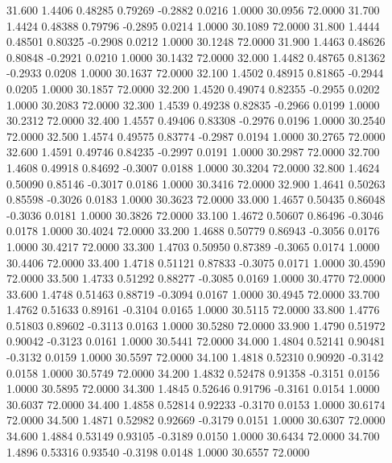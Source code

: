   31.600   1.4406   0.48285   0.79269  -0.2882   0.0216   1.0000  30.0956  72.0000
  31.700   1.4424   0.48388   0.79796  -0.2895   0.0214   1.0000  30.1089  72.0000
  31.800   1.4444   0.48501   0.80325  -0.2908   0.0212   1.0000  30.1248  72.0000
  31.900   1.4463   0.48626   0.80848  -0.2921   0.0210   1.0000  30.1432  72.0000
  32.000   1.4482   0.48765   0.81362  -0.2933   0.0208   1.0000  30.1637  72.0000
  32.100   1.4502   0.48915   0.81865  -0.2944   0.0205   1.0000  30.1857  72.0000
  32.200   1.4520   0.49074   0.82355  -0.2955   0.0202   1.0000  30.2083  72.0000
  32.300   1.4539   0.49238   0.82835  -0.2966   0.0199   1.0000  30.2312  72.0000
  32.400   1.4557   0.49406   0.83308  -0.2976   0.0196   1.0000  30.2540  72.0000
  32.500   1.4574   0.49575   0.83774  -0.2987   0.0194   1.0000  30.2765  72.0000
  32.600   1.4591   0.49746   0.84235  -0.2997   0.0191   1.0000  30.2987  72.0000
  32.700   1.4608   0.49918   0.84692  -0.3007   0.0188   1.0000  30.3204  72.0000
  32.800   1.4624   0.50090   0.85146  -0.3017   0.0186   1.0000  30.3416  72.0000
  32.900   1.4641   0.50263   0.85598  -0.3026   0.0183   1.0000  30.3623  72.0000
  33.000   1.4657   0.50435   0.86048  -0.3036   0.0181   1.0000  30.3826  72.0000
  33.100   1.4672   0.50607   0.86496  -0.3046   0.0178   1.0000  30.4024  72.0000
  33.200   1.4688   0.50779   0.86943  -0.3056   0.0176   1.0000  30.4217  72.0000
  33.300   1.4703   0.50950   0.87389  -0.3065   0.0174   1.0000  30.4406  72.0000
  33.400   1.4718   0.51121   0.87833  -0.3075   0.0171   1.0000  30.4590  72.0000
  33.500   1.4733   0.51292   0.88277  -0.3085   0.0169   1.0000  30.4770  72.0000
  33.600   1.4748   0.51463   0.88719  -0.3094   0.0167   1.0000  30.4945  72.0000
  33.700   1.4762   0.51633   0.89161  -0.3104   0.0165   1.0000  30.5115  72.0000
  33.800   1.4776   0.51803   0.89602  -0.3113   0.0163   1.0000  30.5280  72.0000
  33.900   1.4790   0.51972   0.90042  -0.3123   0.0161   1.0000  30.5441  72.0000
  34.000   1.4804   0.52141   0.90481  -0.3132   0.0159   1.0000  30.5597  72.0000
  34.100   1.4818   0.52310   0.90920  -0.3142   0.0158   1.0000  30.5749  72.0000
  34.200   1.4832   0.52478   0.91358  -0.3151   0.0156   1.0000  30.5895  72.0000
  34.300   1.4845   0.52646   0.91796  -0.3161   0.0154   1.0000  30.6037  72.0000
  34.400   1.4858   0.52814   0.92233  -0.3170   0.0153   1.0000  30.6174  72.0000
  34.500   1.4871   0.52982   0.92669  -0.3179   0.0151   1.0000  30.6307  72.0000
  34.600   1.4884   0.53149   0.93105  -0.3189   0.0150   1.0000  30.6434  72.0000
  34.700   1.4896   0.53316   0.93540  -0.3198   0.0148   1.0000  30.6557  72.0000
